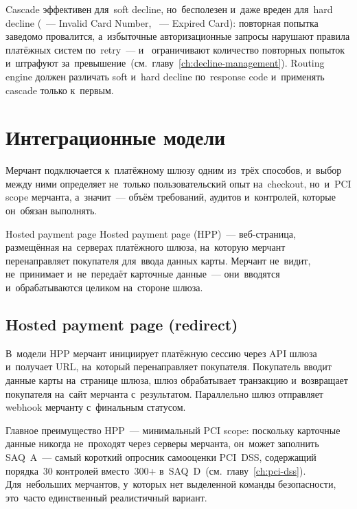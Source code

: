 Cascade эффективен для~soft decline, но~бесполезен и~даже вреден
для~hard decline (~--- Invalid Card Number, ~---
Expired Card): повторная попытка заведомо провалится, а~избыточные
авторизационные запросы нарушают правила платёжных систем по~retry~---
 и~ ограничивают количество повторных
попыток и~штрафуют за~превышение~(см.~главу~\ref{ch:decline-management}).
Routing engine должен различать soft и~hard decline по~response code
и~применять cascade только к~первым.


\section{Интеграционные модели}
\label{sec:gw-integration}

Мерчант подключается к~платёжному шлюзу одним из~трёх способов,
и~выбор между ними определяет не~только пользовательский опыт
на~checkout, но~и~PCI scope мерчанта, а~значит~--- объём
требований, аудитов и~контролей, которые он~обязан выполнять.

\begin{termdef}{Hosted payment page}
  Hosted payment page (HPP)~--- веб-страница, размещённая
  на~серверах платёжного шлюза, на~которую мерчант перенаправляет
  покупателя для~ввода данных карты. Мерчант не~видит,
  не~принимает и~не~передаёт карточные данные~--- они~вводятся
  и~обрабатываются целиком на~стороне шлюза.
\end{termdef}

\subsection*{Hosted payment page (redirect)}

В~модели HPP мерчант инициирует платёжную сессию через API шлюза
и~получает URL, на~который перенаправляет покупателя. Покупатель
вводит данные карты на~странице шлюза, шлюз обрабатывает транзакцию
и~возвращает покупателя на~сайт мерчанта с~результатом.
Параллельно шлюз отправляет webhook мерчанту с~финальным статусом.

Главное преимущество HPP~--- минимальный PCI scope: поскольку
карточные данные никогда не~проходят через серверы мерчанта,
он~может заполнить SAQ~A~--- самый короткий опросник самооценки
PCI~DSS, содержащий порядка~30 контролей вместо~300+
в~SAQ~D~(см.~главу~\ref{ch:pci-dss}). Для~небольших мерчантов,
у~которых нет выделенной команды безопасности, это~часто
единственный реалистичный вариант.


